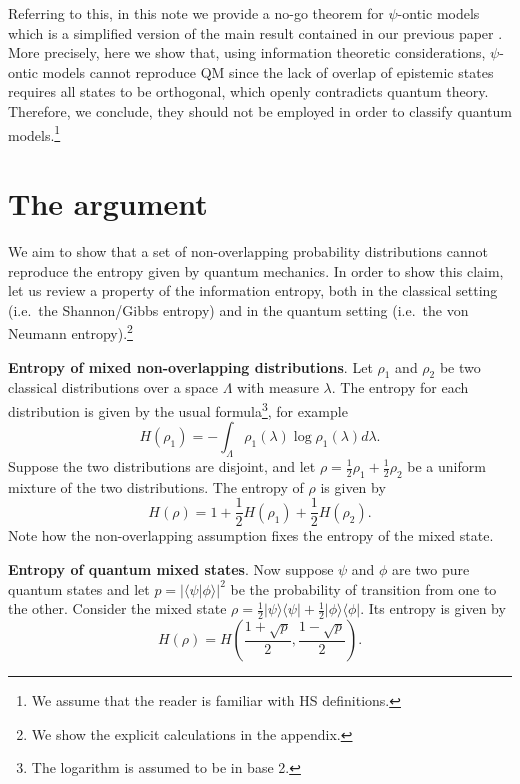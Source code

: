 \documentclass[10pt,twocolumn, nofootinbib]{revtex4-2}
\begin{document}
Referring to this, in this note we provide a no-go theorem for $\psi$-ontic models which is a simplified version of the main result contained in our previous paper \cite{Carcassi:2022}. More precisely, here we show that, using information theoretic considerations, $\psi$-ontic models cannot reproduce QM since the lack of overlap of epistemic states requires all states to be orthogonal, which openly contradicts quantum theory. Therefore, we conclude, they should not be employed in order to classify quantum models.\footnote{We assume that the reader is familiar with HS definitions.} 

\section{The argument}

We aim to show that a set of non-overlapping probability distributions cannot reproduce the entropy given by quantum mechanics. In order to show this claim, let us review a property of the information entropy, both in the classical setting (i.e.\ the Shannon/Gibbs entropy) and in the quantum setting (i.e.\ the von Neumann entropy).\footnote{We show the explicit calculations in the appendix.}

\textbf{Entropy of mixed non-overlapping distributions}. Let $\rho_1$ and $\rho_2$ be two classical distributions over a space $\Lambda$ with measure $\lambda$. The entropy for each distribution is given by the usual formula\footnote{The logarithm is assumed to be in base 2.}, for example
\begin{equation}\label{shannon_entropy}
	H(\rho_1) = - \int_\Lambda \rho_1(\lambda) \log \rho_1(\lambda) d\lambda.
\end{equation}
Suppose the two distributions are disjoint, and let $\rho = \frac{1}{2} \rho_1 + \frac{1}{2} \rho_2$ be a uniform mixture of the two distributions. The entropy of $\rho$ is given by
\begin{equation}\label{entropy_nonoverlap}
	H(\rho) = 1 + \frac{1}{2} H(\rho_1) + \frac{1}{2} H(\rho_2).
\end{equation}
Note how the non-overlapping assumption fixes the entropy of the mixed state.

\textbf{Entropy of quantum mixed states}. Now suppose $\psi$ and $\phi$ are two pure quantum states and let $p = | \langle \psi | \phi \rangle |^2$ be the probability of transition from one to the other. Consider the mixed state $\rho = \frac{1}{2} | \psi \rangle \langle \psi | + \frac{1}{2} | \phi \rangle \langle \phi |$. Its entropy is given by
\begin{equation}\label{entropy_mixed}
	H(\rho) = H\left(\frac{1+\sqrt{p}}{2}, \frac{1-\sqrt{p}}{2}\right).
\end{equation}
\end{document}

